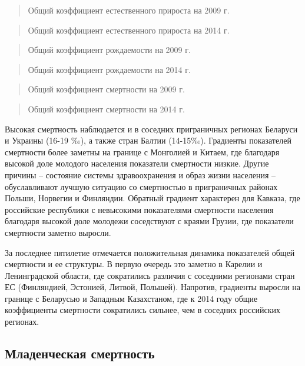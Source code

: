 \documentclass[]{book}
\begin{document}
\begin{quote}
Общий коэффициент естественного прироста на 2009 г.
\end{quote}

\begin{quote}
Общий коэффициент естественного прироста на 2014 г.
\end{quote}

\begin{quote}
Общий коэффициент рождаемости на 2009 г.
\end{quote}

\begin{quote}
Общий коэффициент рождаемости на 2014 г.
\end{quote}

\begin{quote}
Общий коэффициент смертности на 2009 г.
\end{quote}

\begin{quote}
Общий коэффициент смертности на 2014 г.
\end{quote}

Высокая смертность наблюдается и в соседних приграничных регионах
Беларуси и Украины (16-19 ‰), а также стран Балтии (14-15‰). Градиенты
показателей смертности более заметны на границе с Монголией и Китаем,
где благодаря высокой доле молодого населения показатели смертности
низкие. Другие причины -- состояние системы здравоохранения и образ
жизни населения -- обуславливают лучшую ситуацию со смертностью в
приграничных районах Польши, Норвегии и Финляндии. Обратный градиент
характерен для Кавказа, где российские республики с невысокими
показателями смертности населения благодаря высокой доле молодежи
соседствуют с краями Грузии, где показатели смертности заметно выросли.

За последнее пятилетие отмечается положительная динамика показателей
общей смертности и ее структуры. В первую очередь это заметно в Карелии
и Ленинградской области, где сократились различия с соседними регионами
стран ЕС (Финляндией, Эстонией, Литвой, Польшей). Напротив, градиенты
выросли на границе с Беларусью и Западным Казахстаном, где к 2014 году
общие коэффициенты смертности сократились сильнее, чем в соседних
российских регионах.

\subsection{Младенческая смертность}\label{demo-situ-bab}
\end{document}
